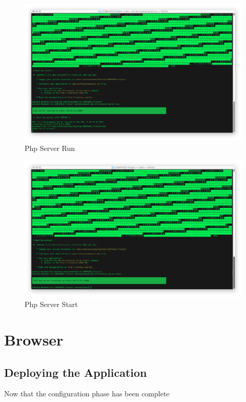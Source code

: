 \begin{figure}[htbp]
   \centering
   \includegraphics[width=400pt]{figures/php_server_run.png} %
   \caption{Php Server Run}
   \label{fig:Php Server Run}
\end{figure}

\begin{figure}[htbp]
   \centering
   \includegraphics[width=400pt]{figures/php_server_start.png} %
   \caption{Php Server Start}
   \label{fig:Php Server Start}
\end{figure}

\section{Browser}

\subsection{Deploying the Application}

Now that the configuration phase has been complete